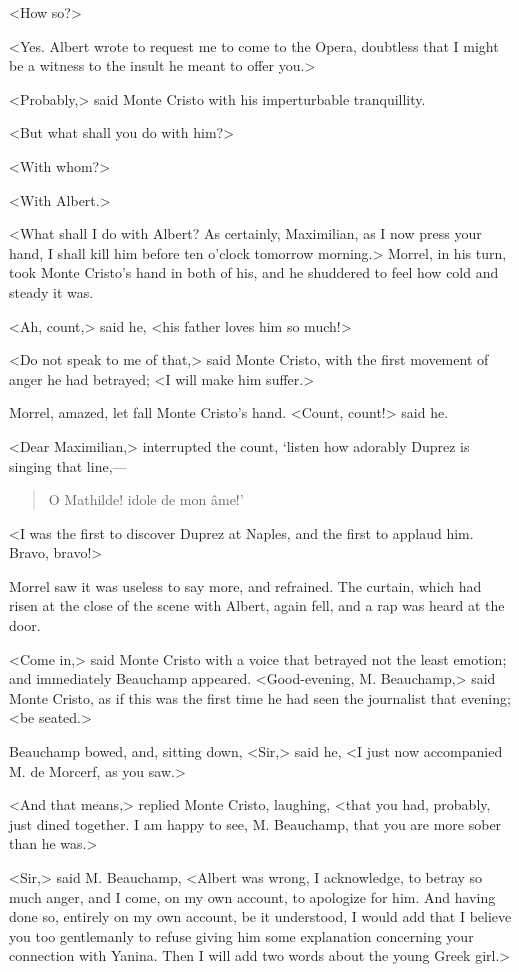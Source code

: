  <How so?> 

 <Yes. Albert wrote to request me to come to the Opera, doubtless that I might be a witness to the insult he meant to offer you.> 

 <Probably,> said Monte Cristo with his imperturbable tranquillity. 

 <But what shall you do with him?> 

 <With whom?> 

 <With Albert.> 

 <What shall I do with Albert? As certainly, Maximilian, as I now press your hand, I shall kill him before ten o'clock tomorrow morning.> Morrel, in his turn, took Monte Cristo's hand in both of his, and he shuddered to feel how cold and steady it was. 

 <Ah, count,> said he, <his father loves him so much!> 

 <Do not speak to me of that,> said Monte Cristo, with the first movement of anger he had betrayed; <I will make him suffer.> 

 Morrel, amazed, let fall Monte Cristo's hand. <Count, count!> said he. 

 <Dear Maximilian,> interrupted the count, `listen how adorably Duprez is singing that line,—  
 \begin{verse}
 O Mathilde! idole de mon âme!'
 \end{verse}

 <I was the first to discover Duprez at Naples, and the first to applaud him. Bravo, bravo!> 

 Morrel saw it was useless to say more, and refrained. The curtain, which had risen at the close of the scene with Albert, again fell, and a rap was heard at the door. 

 <Come in,> said Monte Cristo with a voice that betrayed not the least emotion; and immediately Beauchamp appeared. <Good-evening, M. Beauchamp,> said Monte Cristo, as if this was the first time he had seen the journalist that evening; <be seated.> 

 Beauchamp bowed, and, sitting down, <Sir,> said he, <I just now accompanied M. de Morcerf, as you saw.> 

 <And that means,> replied Monte Cristo, laughing, <that you had, probably, just dined together. I am happy to see, M. Beauchamp, that you are more sober than he was.> 

 <Sir,> said M. Beauchamp, <Albert was wrong, I acknowledge, to betray so much anger, and I come, on my own account, to apologize for him. And having done so, entirely on my own account, be it understood, I would add that I believe you too gentlemanly to refuse giving him some explanation concerning your connection with Yanina. Then I will add two words about the young Greek girl.> 

